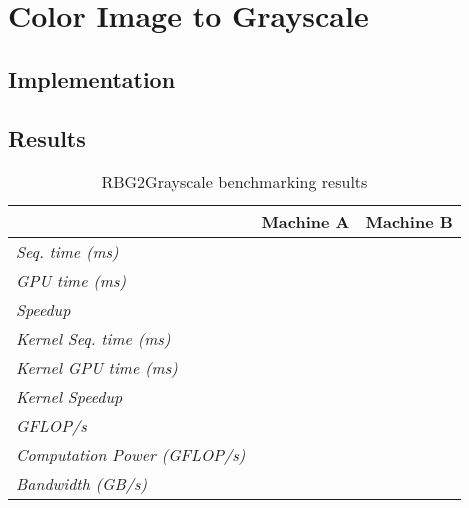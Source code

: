 \documentclass[final]{report}
\begin{document}
\chapter{Color Image to Grayscale}


\section{Implementation}

\section{Results}
\begin{table}[H]
	\centering
	\caption{RBG2Grayscale benchmarking results}
	\label{tab:rgb2grayscale-results}
	\begin{tabular}{lll}
	\toprule
											& \textbf{Machine A} 	& \textbf{Machine B} \\
	\midrule
	\textit{Seq. time (ms)} 				& ~ 					& ~ \\
	\textit{GPU time (ms)} 					& ~ 					& ~ \\
	\textit{Speedup} 						& ~ 					& ~ \\
	\midrule
	\textit{Kernel Seq. time (ms)} 			& ~ 					& ~ \\
	\textit{Kernel GPU time (ms)} 			& ~ 					& ~ \\
	\textit{Kernel Speedup} 				& ~ 					& ~ \\
	\midrule
	\textit{GFLOP/s} 						& ~ 					& ~ \\
	\textit{Computation Power (GFLOP/s)} 	& ~ 					& ~ \\
	\textit{Bandwidth (GB/s)}				& ~ 					& ~ \\
	\bottomrule
	\end{tabular}
\end{table}
\end{document}
